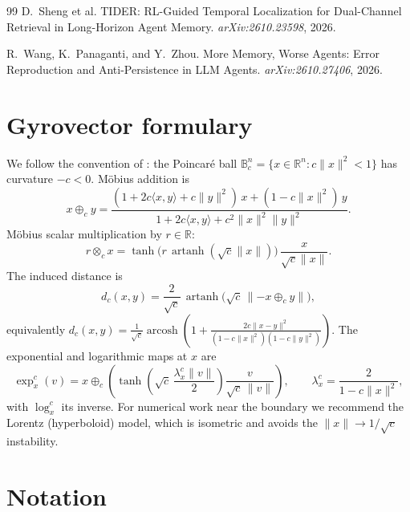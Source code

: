 \documentclass[11pt,a4paper]{article}
\newcommand{\B}{\mathbb{B}}
\newcommand{\R}{\mathbb{R}}
\begin{document}
\begin{thebibliography}{99}
 D.~Sheng et al.
\newblock TIDER: RL-Guided Temporal Localization for Dual-Channel Retrieval
in Long-Horizon Agent Memory.
\newblock \emph{arXiv:2610.23598}, 2026.

 R.~Wang, K.~Panaganti, and Y.~Zhou.
\newblock More Memory, Worse Agents: Error Reproduction and Anti-Persistence
in LLM Agents.
\newblock \emph{arXiv:2610.27406}, 2026.

\end{thebibliography}

\appendix
\section{Gyrovector formulary}
\label{app:formulary}

We follow the convention of \cite{ganea2018}: the Poincar\'e ball
$\B^n_c = \{x \in \R^n : c\|x\|^2 < 1\}$ has curvature $-c < 0$.
M\"obius addition is
\begin{equation}
x \oplus_c y =
\frac{(1 + 2c\langle x,y\rangle + c\|y\|^2)\,x + (1 - c\|x\|^2)\,y}
{1 + 2c\langle x,y\rangle + c^2\|x\|^2\|y\|^2}.
\end{equation}
M\"obius scalar multiplication by $r \in \R$:
\begin{equation}
r \otimes_c x = \tanh\!\big(r\,\operatorname{artanh}(\sqrt{c}\|x\|)\big)\,
\frac{x}{\sqrt{c}\|x\|}.
\end{equation}
The induced distance is
\begin{equation}
d_c(x,y) = \frac{2}{\sqrt{c}}\,
\operatorname{artanh}\!\big(\sqrt{c}\,\|{-x} \oplus_c y\|\big),
\end{equation}
equivalently $d_c(x,y) = \frac{1}{\sqrt{c}}\operatorname{arcosh}\!\left(1 +
\frac{2c\|x-y\|^2}{(1-c\|x\|^2)(1-c\|y\|^2)}\right)$.
The exponential and logarithmic maps at $x$ are
\begin{equation}
\exp^c_x(v) = x \oplus_c \left(
\tanh\!\left(\sqrt{c}\,\frac{\lambda^c_x \|v\|}{2}\right)
\frac{v}{\sqrt{c}\,\|v\|}\right), \qquad
\lambda^c_x = \frac{2}{1 - c\|x\|^2},
\end{equation}
with $\log^c_x$ its inverse. For numerical work near the boundary we
recommend the Lorentz (hyperboloid) model, which is isometric and avoids
the $\|x\| \to 1/\sqrt{c}$ instability.

\section{Notation}
\label{app:notation}
\end{document}
